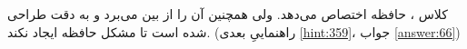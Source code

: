 \section{}
\paragraph{}\label{hint:146}
کلاس  ، حافظه اختصاص می‌دهد. ولی همچنین آن را از بین می‌برد و به دقت طراحی شده است تا مشکل حافظه ایجاد نکند. (راهنماییِ بعدی \ref{hint:359}، جواب \ref{answer:66})